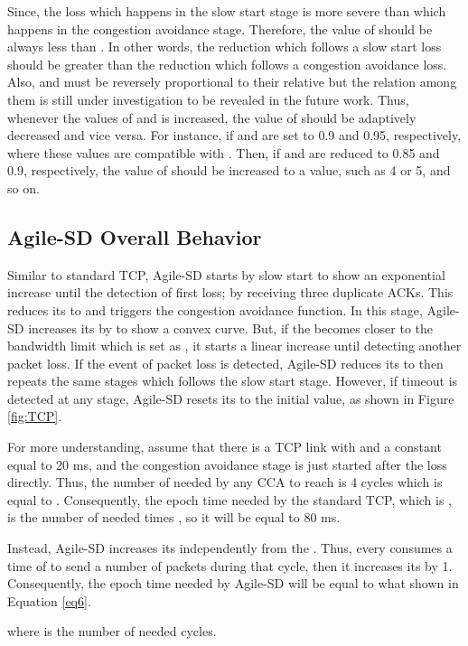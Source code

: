 \documentclass[preprint,3p,times,twocolumn,authoryear]{elsarticle}
\begin{document}
Since, the loss which happens in the slow start stage is more severe than which happens in the congestion avoidance stage. Therefore, the value of  should be always less than . In other words, the reduction which follows a slow start loss should be greater than the reduction which follows a congestion avoidance loss. Also,  and  must be reversely proportional to their relative  but the relation among them is still under investigation to be revealed in the future work. Thus, whenever the values of  and  is increased, the value of  should be adaptively decreased and vice versa. For instance, if  and  are set to 0.9 and 0.95, respectively, where these values are compatible with . Then, if  and  are reduced to 0.85 and 0.9, respectively, the value of  should be increased to a value, such as 4 or 5, and so on.

\subsection{Agile-SD Overall Behavior}

Similar to standard TCP, Agile-SD starts by slow start to show an exponential increase until the detection of first loss; by receiving three duplicate ACKs. This reduces its  to  and triggers the congestion avoidance function. In this stage, Agile-SD increases its  by  to show a convex curve. But, if the  becomes closer to the bandwidth limit which is set as , it starts a linear increase until detecting another packet loss. If the event of packet loss is detected, Agile-SD reduces its  to  then repeats the same stages which follows the slow start stage. However, if timeout is detected at any stage, Agile-SD resets its  to the initial value, as shown in Figure \ref{fig:TCP}.

For more understanding, assume that there is a TCP link with  and a constant  equal to 20 ms, and the congestion avoidance stage is just started after the loss directly. Thus, the number of  needed by any CCA to reach  is 4 cycles which is equal to . Consequently, the epoch time needed by the standard TCP, which is , is the number of needed  times , so it will be equal to 80 ms. 

Instead, Agile-SD increases its  independently from the . Thus, every  consumes a time of  to send a number of  packets during that cycle, then it increases its  by 1. Consequently, the epoch time needed by Agile-SD will be equal to what shown in Equation \eqref{eq6}.

where  is the number of needed cycles. 
\end{document}
